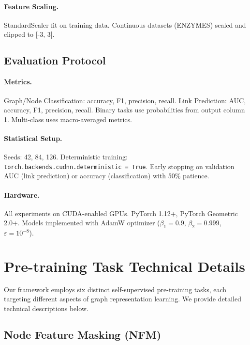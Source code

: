 \documentclass[11pt]{article}
\begin{document}
\paragraph{Feature Scaling.} StandardScaler fit on training data. Continuous datasets (ENZYMES) scaled and clipped to [-3, 3].

\subsection{Evaluation Protocol}

\paragraph{Metrics.} Graph/Node Classification: accuracy, F1, precision, recall. Link Prediction: AUC, accuracy, F1, precision, recall. Binary tasks use probabilities from output column 1. Multi-class uses macro-averaged metrics.

\paragraph{Statistical Setup.} Seeds: 42, 84, 126. Deterministic training: \\\texttt{torch.backends.cudnn.deterministic = True}. Early stopping on validation AUC (link prediction) or accuracy (classification) with 50\% patience.

\paragraph{Hardware.} All experiments on CUDA-enabled GPUs. PyTorch 1.12+, PyTorch Geometric 2.0+. Models implemented with AdamW optimizer ($\beta_1 = 0.9$, $\beta_2 = 0.999$, $\varepsilon = 10^{-8}$).

\section{Pre-training Task Technical Details}
\label{sec:pretrain-tasks}

Our framework employs six distinct self-supervised pre-training tasks, each targeting different aspects of graph representation learning. We provide detailed technical descriptions below.

\subsection{Node Feature Masking (NFM)}
\label{sec:nfm}
\end{document}
